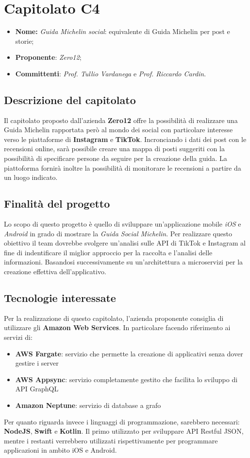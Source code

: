 \section{Capitolato C4}
		\begin{itemize}
			\item \textbf{Nome:} \textit{Guida Michelin social}: equivalente di Guida Michelin per post e storie;
			\item \textbf{Proponente}: \textit{Zero12};
			\item \textbf{Committenti}: \textit{Prof. Tullio Vardanega} e \textit{Prof. Riccardo Cardin}.
		\end{itemize}
		\subsection{Descrizione del capitolato}
		Il capitolato proposto dall'azienda \textbf{Zero12} offre la possibilità di realizzare una Guida Michelin rapportata però al mondo dei social con particolare interesse verso le piattaforme di \textbf{Instagram} e \textbf{TikTok}. Incronciando i dati dei post con le recensioni online, sarà possibile creare una mappa di posti suggeriti con la possibilità di specificare persone da seguire per la creazione della guida. La piattoforma fornirà inoltre la possibilità di monitorare le recensioni a partire da un luogo indicato. 
		\subsection{Finalità del progetto}
		Lo scopo di questo progetto è quello di sviluppare un'applicazione mobile \textit{iOS} e \textit{Android} in grado di mostrare la \textit{Guida Social Michelin}. Per realizzare questo obiettivo il team dovrebbe svolgere un'analisi sulle API di TikTok e Instagram al fine di indentificare il miglior approccio per la raccolta e l'analisi delle informazioni. Basandosi successivamente su un'architettura a microservizi per la creazione effettiva dell'applicativo. 
		\subsection{Tecnologie interessate}
		Per la realizzazione di questo capitolato, l'azienda proponente consiglia di utilizzare gli \textbf{Amazon Web Services}. In particolare facendo riferimento ai servizi di:
			\begin{itemize}
				\item \textbf{AWS Fargate}: servizio che permette la creazione di applicativi senza dover gestire i server
				\item \textbf{AWS Appsync}: servizio completamente gestito che facilita lo sviluppo di API GraphQL
				\item \textbf{Amazon Neptune}: servizio di database a grafo
			\end{itemize}
		Per quanto riguarda invece i linguaggi di programmazione, sarebbero necessari: \textbf{NodeJS}, \textbf{Swift} e \textbf{Kotlin}. Il primo utilizzato per sviluppare API Restful JSON, mentre i restanti verrebbero utilizzati rispettivamente per programmare applicazioni in ambito iOS e Android. 
		\newpage

